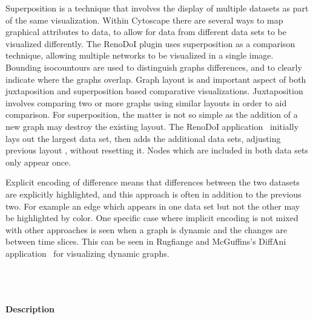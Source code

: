 \documentclass[twocolumn]{bmcart}%
\begin{document}
Superposition is a technique that involves the display of multiple datasets as part of the same visualization.
Within Cytoscape there are several ways to map graphical attributes to data, to allow for data from different data sets to be visualized differently.
The RenoDoI plugin uses superposition as a comparison technique, allowing multiple networks to be visualized in a single image. Bounding isocountours are used to distinguish graphs differences, and to clearly indicate where the graphs overlap.
Graph layout is and important aspect of both juxtaposition and superposition based comparative visualizations.
Juxtaposition involves comparing two or more graphs using similar layouts in order to aid comparison.
For superposition, the matter is not so simple as the addition of a new graph may destroy the existing layout.
The RenoDoI application~\cite{Vehlow2015} initially lays out the largest data set, then adds the additional data sets, adjusting previous layout , without resetting it.
Nodes which are included in both data sets only appear once.

Explicit encoding of difference means that differences between the two datasets are explicitly highlighted, and this approach is often in addition to the previous two. For example an edge which appears in one data set but not the other may be highlighted by color.
One specific case where implicit encoding is not mixed with other approaches is seen when a graph is dynamic and the changes are between time slices.
This can be seen in Rugfiange and McGuffins's DiffAni application~\cite{Rufiange2013} for visualizing dynamic graphs.


\ \\ \

\paragraph*{Description}
\end{document}
